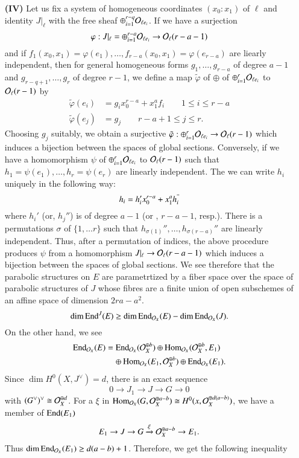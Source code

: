 \begin{itemize}
\item[\bf(IV)] Let us fix a system of homogeneous coordinates $(x_{0} : x_{1})$ of $\ell$ and identity $J|_{\ell}$ with the free sheaf $\oplus_{i=1}^{r-q}\mathcal{O}_{\ell e_{i}}$. If we have a surjection
$$
\varphi : J|_{\ell} = \oplus_{i=1}^{r-a} \mathcal{O}_{\ell e_{i}}\rightarrow \mathcal{O}_{\ell}(r-a-1)
$$
and if $f_{1}(x_{0}, x_{1}) = \varphi(e_{1}), \ldots, f_{r-a}(x_{0},x_{1}) =\varphi(e_{r-a})$ are liearly independent, then for general homogeneous forms $g_{1},\ldots, g_{r-a}$ of degree $a-1$ and $g_{r-q+1},\ldots, g_{r}$ of degree $r-1$, we define a map $\tilde{\varphi}$ of $\oplus$ of $\oplus_{i=1}^{r}\mathcal{O}_{\ell  e_{i}}$ to $\mathcal{O}_{\ell}(r-1)$ by
\begin{align*}
\tilde{\varphi}(e_{i}) &= g_{i}x_{0}^{r-a} + x_{1}^{a}f_{i} \qquad 1 \leq i \leq r-a\\
\tilde{\varphi}(e_{j}) &=g_{j} \qquad r-a + 1 \leq j \leq r.
\end{align*}
Choosing $g_{j}$ suitably, we obtain a surjective $\tilde{\varphi} : \oplus_{i=1}^{r}\mathcal{O}_{\ell e_{i}} \rightarrow \mathcal{O}_{\ell}(r-1)$ which induces a bijection between the spaces of global sections. Conversely, if we have a homomorphism $\psi$ of $\oplus_{i=1}^{r}\mathcal{O}_{\ell e_{i}}$ to $\mathcal{O}_{\ell}(r-1)$ such that $h_{1}= \psi(e_{1}), \ldots, h_{r}= \psi(e_{r})$ are linearly independent. The  we can write $h_{i}$ uniquely in the following way:
$$
h_{i}=h_{i}'x_{0}^{r-a} + x_{1}^{a}h_{i}^{"}
$$
where $h_{i}'$ (or, $h_{j}''$) is of degree $a-1$ (or , $r-a-1$, resp.). There is a permutations $\sigma$ of $\{ 1, \ldots r\}$ such that $h_{\sigma(1)}'', \ldots,h_{\sigma(r-a)}''$ are linearly independent. Thus, after a  permutation of indices, the above procedure produces $\psi$ from a homomorphism $J|_{\ell} \rightarrow \mathcal{O}_{\ell}(r-a-1)$ which induces a bijection between the spaces of global sections. We see therefore that the parabolic structures on $E$ are parametrtized by a fiber space over the space of parabolic structures of $J$ whose fibres are a finite union of open subschemes of an affine space of dimension $2ra-a^{2}$.
$$
\dim \operatorname{End}^{J}(E) \geq \dim \operatorname{End}_{\mathcal{O}_{X}}(E)-\dim\operatorname{End}_{\mathcal{O}_{X}}(J).
$$
On the other hand, we see
\begin{align*}
\operatorname{End}_{\mathcal{O}_{X}}(E) &= \operatorname{End}_{\mathcal{O}_{X}}(\mathcal{O}_{X}^{\oplus b}) \oplus \operatorname{Hom}_{\mathcal{O}_{X}}(\mathcal{O}_{X}^{\oplus b}, E_{1})\\
                    &\quad  \oplus \operatorname{Hom}_{\mathcal{O}_{X}}(E_{1}, \mathcal{O}_{X}^{\oplus b}) \oplus \operatorname{End}_{\mathcal{O}_{X}}(E_{1}).
\end{align*}
Since $\dim H^{0}(X, J^{\vee})=d$, there is an exact sequence
$$
0 \rightarrow J_{1} \rightarrow  J \rightarrow G \rightarrow 0
$$
with $(G^{\vee})^{\vee} \cong \mathcal{O}_{X}^{\oplus d}$. For a $\xi$ in $\operatorname{Hom}_{\mathcal{O}_{X}}(G, \mathcal{O}_{X}^{\oplus a-b})\cong H^{0}(x, \mathcal{O}_{X}^{\oplus d(a-b)})$, we have a member of $\operatorname{End}(E_{1})$
$$
E_{1} \rightarrow J \rightarrow G \xrightarrow{\xi} \mathcal{O}_{X}^{\oplus a-b} \rightarrow E_{1}.
$$
Thus $\dim \operatorname{End}_{\mathcal{O}_{X}}(E_{1}) \geq d(a-b)+ 1$. Therefore, we get the following inequality


\end{itemize}
